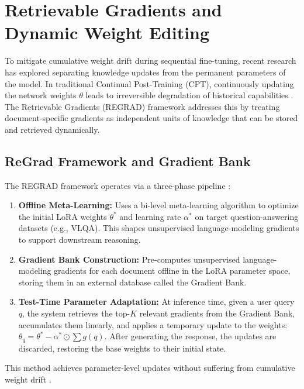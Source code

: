 \section{Retrievable Gradients and Dynamic Weight Editing}

To mitigate cumulative weight drift during sequential fine-tuning, recent research has explored separating knowledge updates from the permanent parameters of the model. In traditional Continual Post-Training (CPT), continuously updating the network weights $\theta$ leads to irreversible degradation of historical capabilities \parencite{yang2024parametercollisionhinderingcontinual}. The Retrievable Gradients (REGRAD) framework \parencite{su2026retrievablegradientscontinualposttraining} addresses this by treating document-specific gradients as independent units of knowledge that can be stored and retrieved dynamically.

\subsection{ReGrad Framework and Gradient Bank}
The REGRAD framework operates via a three-phase pipeline \parencite{su2026retrievablegradientscontinualposttraining}:
\begin{enumerate}
    \item \textbf{Offline Meta-Learning:} Uses a bi-level meta-learning algorithm to optimize the initial LoRA weights $\theta^*$ and learning rate $\alpha^*$ on target question-answering datasets (e.g., VLQA). This shapes unsupervised language-modeling gradients to support downstream reasoning.
    \item \textbf{Gradient Bank Construction:} Pre-computes unsupervised language-modeling gradients for each document offline in the LoRA parameter space, storing them in an external database called the Gradient Bank.
    \item \textbf{Test-Time Parameter Adaptation:} At inference time, given a user query $q$, the system retrieves the top-$K$ relevant gradients from the Gradient Bank, accumulates them linearly, and applies a temporary update to the weights: $\theta_q = \theta^* - \alpha^* \odot \sum g(q)$. After generating the response, the updates are discarded, restoring the base weights to their initial state.
\end{enumerate}
This method achieves parameter-level updates without suffering from cumulative weight drift \parencite{su2026retrievablegradientscontinualposttraining}.

